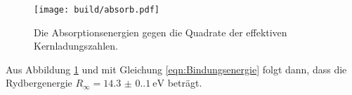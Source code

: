\begin{figure}[H]
  \centering
  \texttt{[image: build/absorb.pdf]}
  \caption{Die Absorptionsenergien gegen die Quadrate der effektiven Kernladungszahlen.}
  \label{fig:absorb}
\end{figure}

Aus Abbildung \ref{fig:absorb} und mit Gleichung \ref{eqn:Bindungsenergie} folgt dann, dass die Rydbergenergie
$R_{\infty}=\qty{14.3(0.1)}{\electronvolt}$ beträgt.